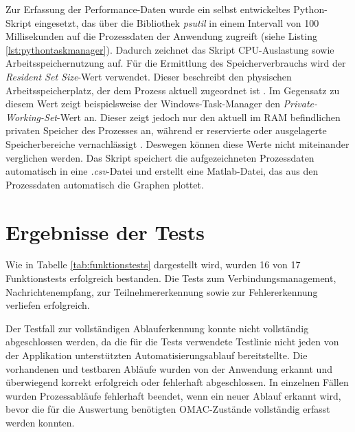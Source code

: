 Zur Erfassung der Performance-Daten wurde ein selbst entwickeltes Python-Skript eingesetzt, das über die Bibliothek \textit{psutil} in einem Intervall von 100 Millisekunden auf die Prozessdaten der Anwendung zugreift  (siehe Listing \ref{lst:pythontaskmanager}). Dadurch zeichnet das Skript CPU-Auslastung sowie Arbeitsspeichernutzung auf. Für die Ermittlung des Speicherverbrauchs wird der \textit{Resident Set Size}-Wert verwendet. Dieser beschreibt den physischen Arbeitsspeicherplatz, der dem Prozess aktuell zugeordnet ist \autocite{PsutilDocumentationPsutil}. Im Gegensatz zu diesem Wert zeigt beispielsweise der Windows-Task-Manager den \textit{Private-Working-Set}-Wert an. Dieser zeigt jedoch nur den aktuell im RAM befindlichen privaten Speicher des Prozesses an, während er reservierte oder ausgelagerte Speicherbereiche vernachlässigt \autocite{yosifovichMemoryInformationTask2023}. Deswegen können diese Werte nicht miteinander verglichen werden. Das Skript speichert die aufgezeichneten Prozessdaten automatisch in eine \textit{.csv}-Datei und erstellt eine Matlab-Datei, das aus den Prozessdaten automatisch die Graphen plottet. 
 
 \section{Ergebnisse der Tests}
Wie in Tabelle \ref{tab:funktionstests} dargestellt wird, wurden 16 von 17 Funktionstests erfolgreich bestanden. Die Tests zum Verbindungsmanagement, Nachrichtenempfang, zur Teilnehmererkennung sowie zur Fehlererkennung verliefen erfolgreich. 

Der Testfall zur vollständigen Ablauferkennung konnte nicht vollständig abgeschlossen werden, da die für die Tests verwendete Testlinie nicht jeden von der Applikation unterstützten Automatisierungsablauf bereitstellte. Die vorhandenen und testbaren Abläufe wurden von der Anwendung erkannt und überwiegend korrekt erfolgreich oder fehlerhaft abgeschlossen. In einzelnen Fällen wurden Prozessabläufe fehlerhaft beendet, wenn ein neuer Ablauf erkannt wird, bevor die für die Auswertung benötigten OMAC-Zustände vollständig erfasst werden konnten. 

